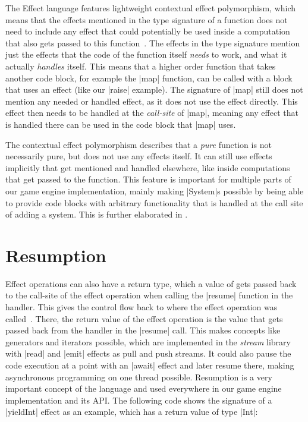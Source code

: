 The Effect language features lightweight contextual effect polymorphism, which means that the effects mentioned in the type signature of a function does not need to include any effect that could potentially be used inside a computation that also gets passed to this function~\cite{brachthauser2020effects}. The effects in the type signature mention just the effects that the code of the function itself \textit{needs} to work, and what it actually \textit{handles} itself. This means that a higher order function that takes another code block, for example the |map| function, can be called with a block that uses an effect (like our |raise| example). The signature of |map| still does not mention any needed or handled effect, as it does not use the effect directly. This effect then needs to be handled at the \textit{call-site} of |map|, meaning any effect that is handled there can be used in the code block that |map| uses.

The contextual effect polymorphism describes that a \textit{pure} function is not necessarily pure, but does not use any effects itself. It can still use effects implicitly that get mentioned and handled elsewhere, like inside computations that get passed to the function. This feature is important for multiple parts of our game engine implementation, mainly making |System|s possible by being able to provide code blocks with arbitrary functionality that is handled at the call site of adding a system. This is further elaborated in .

\section{Resumption}

Effect operations can also have a return type, which a value of gets passed back to the call-site of the effect operation when calling the |resume| function in the handler. This gives the control flow back to where the effect operation was called~\cite{brachthauser2020effects}. There, the return value of the effect operation is the value that gets passed back from the handler in the |resume| call. This makes concepts like generators and iterators possible, which are implemented in the \textit{stream} library with |read| and |emit| effects as pull and push streams. It could also pause the code execution at a point with an |await| effect and later resume there, making asynchronous programming on one thread possible. Resumption is a very important concept of the language and used everywhere in our game engine implementation and its API. The following code shows the signature of a |yieldInt| effect as an example, which has a return value of type |Int|:

